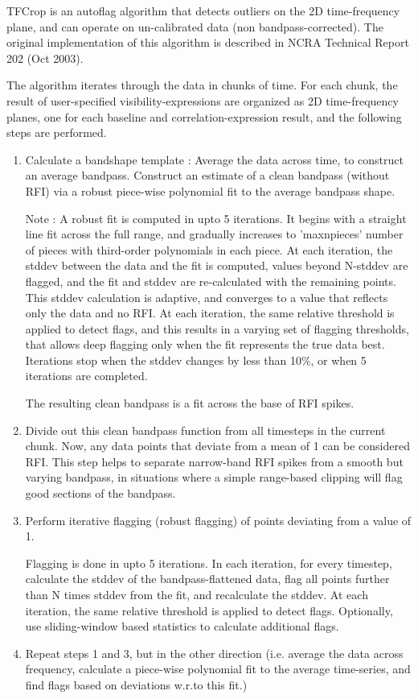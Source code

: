 TFCrop is an autoflag algorithm that detects outliers on the 2D
time-frequency plane, and can operate on un-calibrated data (non
bandpass-corrected). The original implementation of this algorithm is
described in NCRA Technical Report 202 (Oct 2003).

The algorithm iterates through the data in chunks of time. For each
chunk, the result of user-specified visibility-expressions are
organized as 2D time-frequency planes, one for each baseline and
correlation-expression result, and the following steps are performed.

\begin{enumerate}
\item Calculate a bandshape template : Average the data across time, to
construct an average bandpass. Construct an estimate of a clean
bandpass (without RFI) via a robust piece-wise polynomial fit to the
average bandpass shape.

Note : A robust fit is computed in upto 5 iterations. It begins with a
straight line fit across the full range, and gradually increases to
'maxnpieces' number of pieces with third-order polynomials in each
piece. At each iteration, the stddev between the data and the fit is
computed, values beyond N-stddev are flagged, and the fit and stddev
are re-calculated with the remaining points. This stddev calculation
is adaptive, and converges to a value that reflects only the data and
no RFI. At each iteration, the same relative threshold is applied to
detect flags, and this results in a varying set of flagging
thresholds, that allows deep flagging only when the fit represents the
true data best. Iterations stop when the stddev changes by less than
10\%, or when 5 iterations are completed.

The resulting clean bandpass is a fit across the base of RFI spikes.

\item Divide out this clean bandpass function from all timesteps in the
current chunk. Now, any data points that deviate from a mean of 1 can
be considered RFI. This step helps to separate narrow-band RFI spikes
from a smooth but varying bandpass, in situations where a simple
range-based clipping will flag good sections of the bandpass.

\item Perform iterative flagging (robust flagging) of points deviating from
a value of 1.

Flagging is done in upto 5 iterations. In each iteration, for every
timestep, calculate the stddev of the bandpass-flattened data, flag
all points further than N times stddev from the fit, and recalculate
the stddev. At each iteration, the same relative threshold is applied
to detect flags. Optionally, use sliding-window based statistics to
calculate additional flags.

\item Repeat steps 1 and 3, but in the other direction (i.e. average the
data across frequency, calculate a piece-wise polynomial fit to the
average time-series, and find flags based on deviations w.r.to this
fit.)

\end{enumerate}

